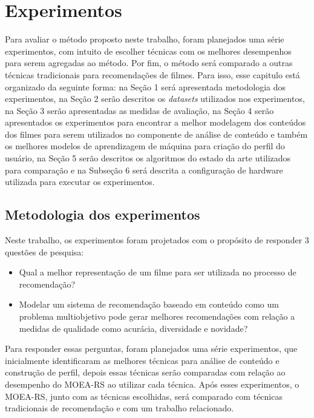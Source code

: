 \chapter{Experimentos}\label{cap_exemplos}
Para avaliar o método proposto neste trabalho, foram planejados uma série experimentos, com intuito de escolher técnicas com os melhores desempenhos para serem agregadas ao método. Por fim, o método será comparado a outras técnicas tradicionais para recomendações de filmes. Para isso, esse capitulo está organizado da seguinte forma: na Seção 1 será apresentada metodologia dos experimentos, na Seção 2 serão descritos os \textit{datasets} utilizados nos experimentos, na Seção 3 serão apresentadas as medidas de avaliação, na Seção 4 serão apresentados os experimentos para encontrar a melhor modelagem dos conteúdos dos filmes para serem utilizados no componente de análise de conteúdo e também os melhores modelos de aprendizagem de máquina para criação do perfil do usuário,   na Seção 5 serão descritos os algoritmos do estado da arte utilizados para comparação e na Subseção 6 será descrita a configuração de hardware utilizada para executar os experimentos. 

\section{Metodologia dos experimentos}
Neste trabalho, os experimentos foram  projetados com o propósito de responder 3 questões de pesquisa:
\begin{itemize}
    \item Qual a melhor representação de um filme para ser utilizada no processo de recomendação?
    \item Modelar um sistema de recomendação baseado em conteúdo como um problema multiobjetivo pode gerar melhores recomendações com relação a medidas de qualidade como acurácia, diversidade e novidade?
\end{itemize}

Para responder essas perguntas, foram planejados uma série experimentos, que inicialmente identificaram as melhores técnicas para análise de conteúdo e construção de perfil, depois essas técnicas serão comparadas com relação ao desempenho do MOEA-RS ao utilizar cada técnica. Após esses experimentos, o MOEA-RS, junto com as técnicas escolhidas, será comparado com técnicas tradicionais de recomendação e com um trabalho relacionado.
